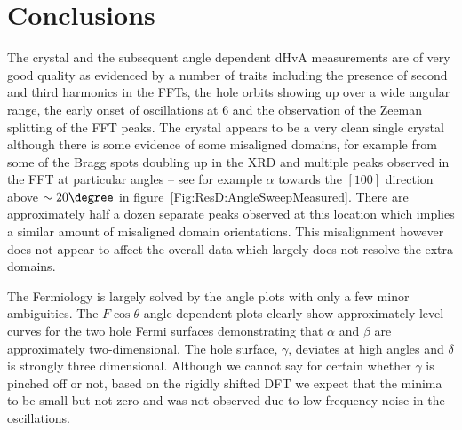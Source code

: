 
\section{Conclusions}

The \BaFeP crystal and the subsequent angle dependent \ac{dHvA} measurements are of very good quality as evidenced by a number of traits including the presence of second and third harmonics in the \acp{FFT}, the hole orbits showing up over a wide angular range, the early onset of oscillations at \unit{6}{\tesla} and the observation of the Zeeman splitting of the \ac{FFT} peaks. The crystal appears to be a very clean single crystal although there is some evidence of some misaligned domains, for example from some of the Bragg spots doubling up in the \ac{XRD} and multiple peaks observed in the \ac{FFT} at particular angles -- see for example $\alpha$ towards the $[100]$ direction above $\sim 20\degree$ in figure~\ref{Fig:ResD:AngleSweepMeasured}. There are approximately half a dozen separate peaks observed at this location which implies a similar amount of misaligned domain orientations. This misalignment however does not appear to affect the overall data which largely does not resolve the extra domains.

The Fermiology is largely solved by the angle plots with only a few minor ambiguities.  The $F\cos \theta$ angle dependent plots clearly show approximately level curves for the two hole Fermi surfaces demonstrating that $\alpha$ and $\beta$ are approximately two-dimensional. The hole surface, $\gamma$, deviates at high angles and $\delta$ is strongly three dimensional. Although we cannot say for certain whether $\gamma$ is pinched off or not, based on the rigidly shifted \ac{DFT} we expect that the minima to be small but not zero and was not observed due to low frequency noise in the oscillations.

